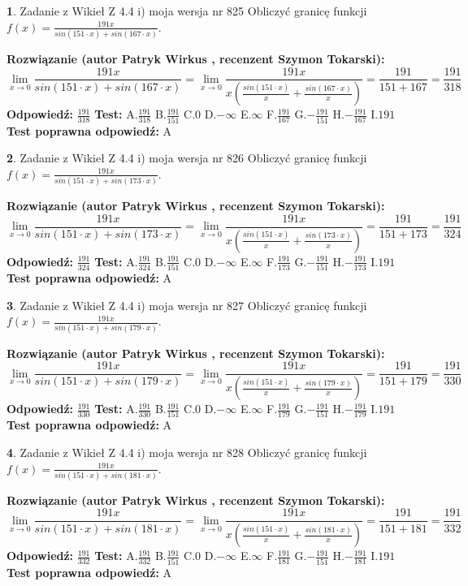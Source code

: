 \documentclass[12pt, a4paper]{article}
\theoremstyle{definition} %
\newtheorem{zad}{}
\newcommand{\zadStart}[1]{\begin{zad}#1\newline}
\newcommand{\zadStop}{\end{zad}}
\newcommand{\rozwStart}[2]{\noindent \textbf{Rozwiązanie (autor #1 , recenzent #2): }\newline}
\newcommand{\rozwStop}{\newline}
\newcommand{\odpStart}{\noindent \textbf{Odpowiedź:}\newline}
\newcommand{\odpStop}{\newline}
\newcommand{\testStart}{\noindent \textbf{Test:}\newline}
\newcommand{\testStop}{\newline}
\newcommand{\kluczStart}{\noindent \textbf{Test poprawna odpowiedź:}\newline}
\newcommand{\kluczStop}{\newline}
\begin{document}
\zadStart{Zadanie z Wikieł Z 4.4 i) moja wersja nr 825}
Obliczyć granicę funkcji $f(x)=\frac{191x}{sin(151\cdot x) +sin(167\cdot x)}$.
\zadStop
\rozwStart{Patryk Wirkus}{Szymon Tokarski}
$$\lim\limits_{x\to 0}\frac{191x}{sin(151\cdot x) +sin(167\cdot x)}=\lim\limits_{x\to 0}\frac{191x}{x(\frac{sin(151\cdot x)}{x}+\frac{sin(167\cdot x)}{x})}=\frac{191}{151+167} = \frac{191}{318}$$
\rozwStop
\odpStart
$\frac{191}{318}$
\odpStop
\testStart
A.$\frac{191}{318}$
B.$\frac{191}{151}$
C.$0$
D.$-\infty$
E.$\infty$
F.$\frac{191}{167}$
G.$-\frac{191}{151}$
H.$-\frac{191}{167}$
I.$191$
\testStop
\kluczStart
A
\kluczStop



\zadStart{Zadanie z Wikieł Z 4.4 i) moja wersja nr 826}
Obliczyć granicę funkcji $f(x)=\frac{191x}{sin(151\cdot x) +sin(173\cdot x)}$.
\zadStop
\rozwStart{Patryk Wirkus}{Szymon Tokarski}
$$\lim\limits_{x\to 0}\frac{191x}{sin(151\cdot x) +sin(173\cdot x)}=\lim\limits_{x\to 0}\frac{191x}{x(\frac{sin(151\cdot x)}{x}+\frac{sin(173\cdot x)}{x})}=\frac{191}{151+173} = \frac{191}{324}$$
\rozwStop
\odpStart
$\frac{191}{324}$
\odpStop
\testStart
A.$\frac{191}{324}$
B.$\frac{191}{151}$
C.$0$
D.$-\infty$
E.$\infty$
F.$\frac{191}{173}$
G.$-\frac{191}{151}$
H.$-\frac{191}{173}$
I.$191$
\testStop
\kluczStart
A
\kluczStop



\zadStart{Zadanie z Wikieł Z 4.4 i) moja wersja nr 827}
Obliczyć granicę funkcji $f(x)=\frac{191x}{sin(151\cdot x) +sin(179\cdot x)}$.
\zadStop
\rozwStart{Patryk Wirkus}{Szymon Tokarski}
$$\lim\limits_{x\to 0}\frac{191x}{sin(151\cdot x) +sin(179\cdot x)}=\lim\limits_{x\to 0}\frac{191x}{x(\frac{sin(151\cdot x)}{x}+\frac{sin(179\cdot x)}{x})}=\frac{191}{151+179} = \frac{191}{330}$$
\rozwStop
\odpStart
$\frac{191}{330}$
\odpStop
\testStart
A.$\frac{191}{330}$
B.$\frac{191}{151}$
C.$0$
D.$-\infty$
E.$\infty$
F.$\frac{191}{179}$
G.$-\frac{191}{151}$
H.$-\frac{191}{179}$
I.$191$
\testStop
\kluczStart
A
\kluczStop



\zadStart{Zadanie z Wikieł Z 4.4 i) moja wersja nr 828}
Obliczyć granicę funkcji $f(x)=\frac{191x}{sin(151\cdot x) +sin(181\cdot x)}$.
\zadStop
\rozwStart{Patryk Wirkus}{Szymon Tokarski}
$$\lim\limits_{x\to 0}\frac{191x}{sin(151\cdot x) +sin(181\cdot x)}=\lim\limits_{x\to 0}\frac{191x}{x(\frac{sin(151\cdot x)}{x}+\frac{sin(181\cdot x)}{x})}=\frac{191}{151+181} = \frac{191}{332}$$
\rozwStop
\odpStart
$\frac{191}{332}$
\odpStop
\testStart
A.$\frac{191}{332}$
B.$\frac{191}{151}$
C.$0$
D.$-\infty$
E.$\infty$
F.$\frac{191}{181}$
G.$-\frac{191}{151}$
H.$-\frac{191}{181}$
I.$191$
\testStop
\kluczStart
A
\kluczStop
\end{document}
